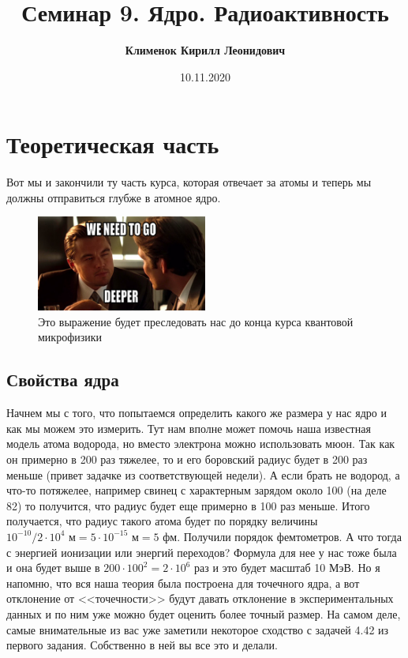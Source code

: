 \documentclass[12pt]{article}
\begin{document}
 
\title{\textbf{Семинар 9. Ядро. Радиоактивность }}
\author{\textbf{Клименок Кирилл Леонидович}}
\date{10.11.2020}
\maketitle
\section{Теоретическая часть}
Вот мы и закончили ту часть курса, которая отвечает за атомы и теперь мы должны отправиться глубже в атомное ядро.
\begin{figure}[h]
    \centering
    \includegraphics[width=0.5\textwidth,height=\textheight,keepaspectratio]{Seminar_09/pics/pic_deeper.jpg}
    \caption{Это выражение будет преследовать нас до конца курса квантовой микрофизики}
\end{figure}
\subsection{Свойства ядра}

Начнем мы с того, что попытаемся определить какого же размера у нас ядро и как мы можем это измерить. Тут нам вполне может помочь наша известная модель атома водорода, но вместо электрона можно использовать мюон. Так как он примерно в 200 раз тяжелее, то и его боровский радиус будет в 200 раз меньше (привет задачке из соответствующей недели). А если брать не водород, а что-то потяжелее, например свинец с характерным зарядом около 100 (на деле 82) то получится, что радиус будет еще примерно в 100 раз меньше. Итого получается, что радиус такого атома будет по порядку величины $10^{-10}/2\cdot 10^{4} \text{ м} =5\cdot 10^{-15} \text{ м} = 5 \text{ фм}$. Получили порядок фемтометров. А что тогда с энергией ионизации или энергий переходов? Формула для нее у нас тоже была и она будет выше в $200\cdot 100^2 = 2\cdot 10^6$ раз и это будет масштаб 10 МэВ. Но я напомню, что вся наша теория была построена для точечного ядра, а вот отклонение от <<точечности>> будут давать отклонение в экспериментальных данных и по ним уже можно будет оценить более точный размер. На самом деле, самые внимательные из вас уже заметили некоторое сходство с задачей 4.42 из первого задания. Собственно в ней вы все это и делали. 
\end{document}

